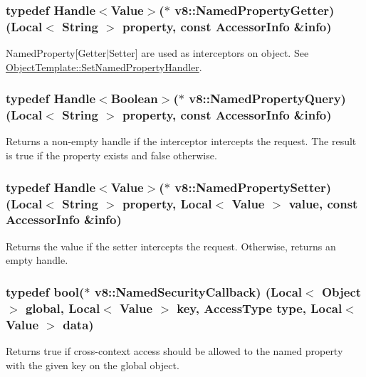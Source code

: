\subsubsection[{Named\+Property\+Getter}]{\setlength{\rightskip}{0pt plus 5cm}typedef {\bf Handle}$<${\bf Value}$>$($\ast$ v8\+::\+Named\+Property\+Getter) ({\bf Local}$<$ {\bf String} $>$ property, const {\bf Accessor\+Info} \&info)}\label{namespacev8_ab9effde41da1c073eddbd4a11a62bd0b}
Named\+Property\mbox{[}Getter$\vert$\+Setter\mbox{]} are used as interceptors on object. See \hyperlink{classv8_1_1_object_template_aa80e9db593d8b954c4153082dc7a439d}{Object\+Template\+::\+Set\+Named\+Property\+Handler}. \hypertarget{namespacev8_a57686a4cebfd2ecbe3a333e7f05463ee}{}
\subsubsection[{Named\+Property\+Query}]{\setlength{\rightskip}{0pt plus 5cm}typedef {\bf Handle}$<${\bf Boolean}$>$($\ast$ v8\+::\+Named\+Property\+Query) ({\bf Local}$<$ {\bf String} $>$ property, const {\bf Accessor\+Info} \&info)}\label{namespacev8_a57686a4cebfd2ecbe3a333e7f05463ee}
Returns a non-\/empty handle if the interceptor intercepts the request. The result is true if the property exists and false otherwise. \hypertarget{namespacev8_a682b1fc46feab32605c4905612ffe870}{}
\subsubsection[{Named\+Property\+Setter}]{\setlength{\rightskip}{0pt plus 5cm}typedef {\bf Handle}$<${\bf Value}$>$($\ast$ v8\+::\+Named\+Property\+Setter) ({\bf Local}$<$ {\bf String} $>$ property, {\bf Local}$<$ {\bf Value} $>$ value, const {\bf Accessor\+Info} \&info)}\label{namespacev8_a682b1fc46feab32605c4905612ffe870}
Returns the value if the setter intercepts the request. Otherwise, returns an empty handle. \hypertarget{namespacev8_aee682f4c3be1abac0f695548f3da7a80}{}
\subsubsection[{Named\+Security\+Callback}]{\setlength{\rightskip}{0pt plus 5cm}typedef bool($\ast$ v8\+::\+Named\+Security\+Callback) ({\bf Local}$<$ {\bf Object} $>$ global, {\bf Local}$<$ {\bf Value} $>$ key, {\bf Access\+Type} type, {\bf Local}$<$ {\bf Value} $>$ data)}\label{namespacev8_aee682f4c3be1abac0f695548f3da7a80}
Returns true if cross-\/context access should be allowed to the named property with the given key on the global object. \hypertarget{namespacev8_a4d5db775dbc002b23f1b55ec7ce80ea5}{}
